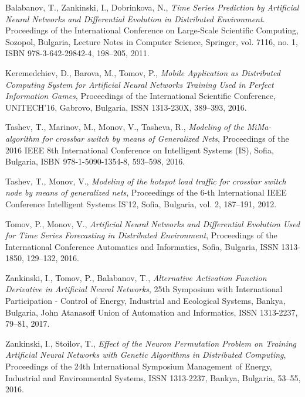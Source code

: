 ﻿\documentclass{llncs}
\begin{document}
\begin{thebibliography}{99}
 Balabanov, T., Zankinski, I., Dobrinkova, N., \textit{Time Series Prediction by Artificial Neural Networks and Differential Evolution in Distributed Environment}. Proceedings of the International Conference on Large-Scale Scientific Computing, Sozopol, Bulgaria, Lecture Notes in Computer Science, Springer, vol. 7116, no. 1, ISBN 978-3-642-29842-4, 198–205, 2011. 

 Keremedchiev, D., Barova, M., Tomov, P., \textit{Mobile Application as Distributed Computing System for Artificial Neural Networks Training Used in Perfect Information Games}, Proceedings of the International Scientific Conference, UNITECH’16, Gabrovo, Bulgaria, ISSN 1313-230X, 389--393, 2016.

 Tashev, T., Marinov, M., Monov, V., Tasheva, R., \textit{Modeling of the MiMa-algorithm for crossbar switch by means of Generalized Nets}, Proceedings of the 2016 IEEE 8th International Conference on Intelligent Systems (IS), Sofia, Bulgaria, ISBN 978-1-5090-1354-8, 593--598, 2016.

 Tashev, T., Monov, V., \textit{Modeling of the hotspot load traffic for crossbar switch node by means of generalized nets}, Proceedings of the 6-th International IEEE Conference Intelligent Systems IS'12, Sofia, Bulgaria, vol. 2, 187--191, 2012.

 Tomov, P., Monov, V., \textit{Artificial Neural Networks and Differential Evolution Used for Time Series Forecasting in Distributed Environment}, Proceedings of the International Conference Automatics and Informatics, Sofia, Bulgaria, ISSN 1313-1850, 129--132, 2016.

 Zankinski, I., Tomov, P., Balabanov, T., \textit{Alternative Activation Function Derivative in Artificial Neural Networks}, 25th Symposium with International Participation - Control of Energy, Industrial and Ecological Systems, Bankya, Bulgaria, John Atanasoff Union of Automation and Informatics, ISSN 1313-2237, 79--81, 2017.

 Zankinski, I., Stoilov, T., \textit{Effect of the Neuron Permutation Problem on Training Artificial Neural Networks with Genetic Algorithms in Distributed Computing}, Proceedings of the 24th International Symposium Management of Energy, Industrial and Environmental Systems, ISSN 1313-2237, Bankya, Bulgaria, 53--55, 2016.

\end{thebibliography}
\end{document}
